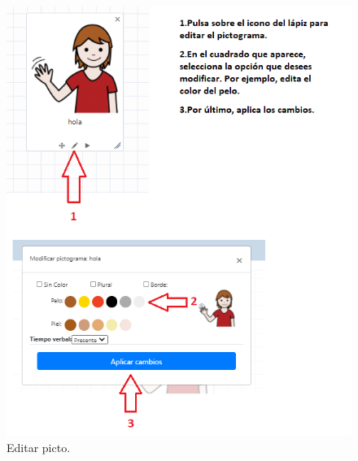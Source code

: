 \begin{figure}[h!]
	\centering
	\includegraphics[width=\linewidth]{Imagenes/Bitmap/Tarea1-Pista3}
	\caption{Editar picto.}
	\label{fig:tarea1-pista3}
\end{figure}



